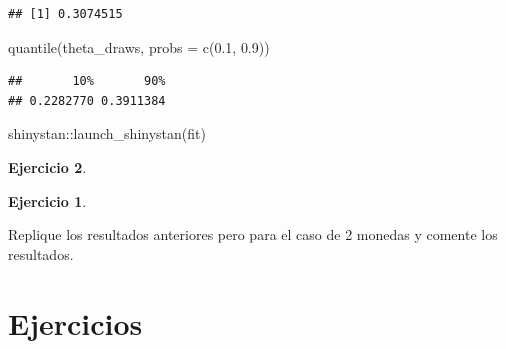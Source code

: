 \documentclass[
  12pt,
]{book}
\newenvironment{Shaded}{\begin{snugshade}}{\end{snugshade}}
\newcommand{\AttributeTok}[1]{\textcolor[rgb]{0.77,0.63,0.00}{#1}}
\newcommand{\FloatTok}[1]{\textcolor[rgb]{0.00,0.00,0.81}{#1}}
\newcommand{\FunctionTok}[1]{\textcolor[rgb]{0.00,0.00,0.00}{#1}}
\newcommand{\NormalTok}[1]{#1}
\newcommand{\OtherTok}[1]{\textcolor[rgb]{0.56,0.35,0.01}{#1}}
\newcommand{\SpecialCharTok}[1]{\textcolor[rgb]{0.00,0.00,0.00}{#1}}
\theoremstyle{definition}
\theoremstyle{definition}
\theoremstyle{definition}
\newtheorem{exercise}{Ejercicio}[chapter]
\theoremstyle{remark}
\begin{document}
\begin{Shaded}
\end{Shaded}

\begin{verbatim}
## [1] 0.3074515
\end{verbatim}

\begin{Shaded}
\begin{Highlighting}[]
\FunctionTok{quantile}\NormalTok{(theta\_draws, }\AttributeTok{probs =} \FunctionTok{c}\NormalTok{(}\FloatTok{0.1}\NormalTok{, }\FloatTok{0.9}\NormalTok{))}
\end{Highlighting}
\end{Shaded}

\begin{verbatim}
##       10%       90% 
## 0.2282770 0.3911384
\end{verbatim}

\begin{Shaded}
\begin{Highlighting}[]
\NormalTok{shinystan}\SpecialCharTok{::}\FunctionTok{launch\_shinystan}\NormalTok{(fit)}
\end{Highlighting}
\end{Shaded}

\begin{exercise}
\begin{exercise}
\protect\hypertarget{exr:unlabeled-div-43}{}\label{exr:unlabeled-div-43}

\protect\hypertarget{exr:unnamed-chunk-167}{}{\label{exr:unnamed-chunk-167} }
Replique los resultados anteriores pero para el caso de 2 monedas y comente los resultados.

\end{exercise}
\end{exercise}

\hypertarget{ejercicios-2}{%
\section{Ejercicios}\label{ejercicios-2}}
\end{document}
